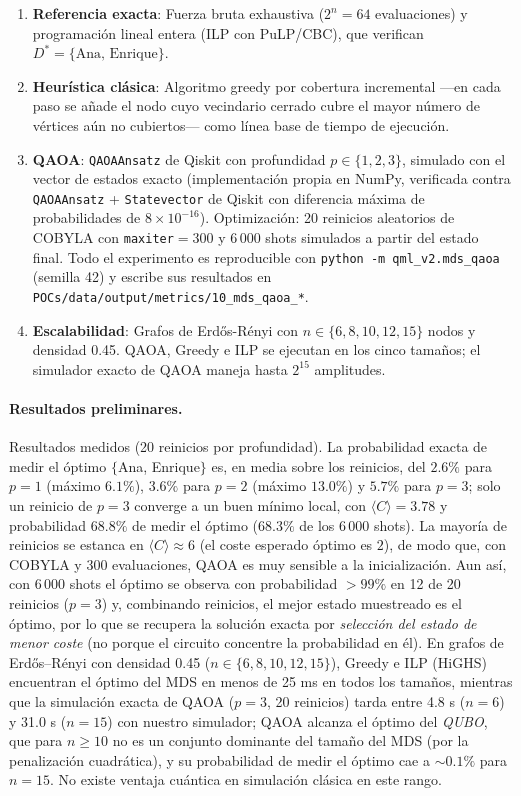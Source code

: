 \begin{enumerate}
  \item \textbf{Referencia exacta}: Fuerza bruta exhaustiva ($2^n = 64$ evaluaciones) y programación lineal entera (ILP con PuLP/CBC), que verifican $D^* = \{\text{Ana, Enrique}\}$.
  \item \textbf{Heurística clásica}: Algoritmo greedy por cobertura incremental —en cada paso se añade el nodo cuyo vecindario cerrado cubre el mayor número de vértices aún no cubiertos— como línea base de tiempo de ejecución.
  \item \textbf{QAOA}: \texttt{QAOAAnsatz} de Qiskit con profundidad $p \in \{1, 2, 3\}$, simulado con el vector de estados exacto (implementación propia en NumPy, verificada contra \texttt{QAOAAnsatz} + \texttt{Statevector} de Qiskit con diferencia máxima de probabilidades de $8\times10^{-16}$). Optimización: 20 reinicios aleatorios de COBYLA con \texttt{maxiter}$=300$ y 6\,000 shots simulados a partir del estado final. Todo el experimento es reproducible con \texttt{python -m qml\_v2.mds\_qaoa} (semilla 42) y escribe sus resultados en \texttt{POCs/data/output/metrics/10\_mds\_qaoa\_*}.
  \item \textbf{Escalabilidad}: Grafos de Erdős-Rényi con $n \in \{6, 8, 10, 12, 15\}$ nodos y densidad 0.45. QAOA, Greedy e ILP se ejecutan en los cinco tamaños; el simulador exacto de QAOA maneja hasta $2^{15}$ amplitudes.
\end{enumerate}

\paragraph{Resultados preliminares.}
Resultados medidos (20 reinicios por profundidad). La probabilidad exacta de medir el óptimo $\{$Ana, Enrique$\}$ es, en media sobre los reinicios, del $2.6\%$ para $p=1$ (máximo $6.1\%$), $3.6\%$ para $p=2$ (máximo $13.0\%$) y $5.7\%$ para $p=3$; solo un reinicio de $p=3$ converge a un buen mínimo local, con $\langle C\rangle=3.78$ y probabilidad $68.8\%$ de medir el óptimo ($68.3\%$ de los 6\,000 shots). La mayoría de reinicios se estanca en $\langle C\rangle\approx 6$ (el coste esperado óptimo es $2$), de modo que, con COBYLA y 300 evaluaciones, QAOA es muy sensible a la inicialización. Aun así, con 6\,000 shots el óptimo se observa con probabilidad $>99\%$ en 12 de 20 reinicios ($p=3$) y, combinando reinicios, el mejor estado muestreado es el óptimo, por lo que se recupera la solución exacta por \emph{selección del estado de menor coste} (no porque el circuito concentre la probabilidad en él). En grafos de Erdős--Rényi con densidad 0.45 ($n\in\{6,8,10,12,15\}$), Greedy e ILP (HiGHS) encuentran el óptimo del MDS en menos de 25 ms en todos los tamaños, mientras que la simulación exacta de QAOA ($p=3$, 20 reinicios) tarda entre 4.8 s ($n=6$) y 31.0 s ($n=15$) con nuestro simulador; QAOA alcanza el óptimo del \emph{QUBO}, que para $n\ge 10$ no es un conjunto dominante del tamaño del MDS (por la penalización cuadrática), y su probabilidad de medir el óptimo cae a $\sim 0.1\%$ para $n=15$. No existe ventaja cuántica en simulación clásica en este rango.

